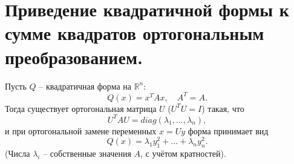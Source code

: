 \documentclass[14pt]{extreport}
\begin{document}
    \chapter{Приведение квадратичной формы к сумме квадратов ортогональным преобразованием.}

    \begin{thbox}
        Пусть $Q$ – квадратичная форма на $\mathbb{R}^n$:
        \[
        Q(x) = x^TAx, \quad A^T = A.
        \]
        Тогда существует ортогональная матрица $U$ ($U^TU=I$) такая, что
        \[
        U^TAU = diag(\lambda_1,...,\lambda_n),
        \]
        и при ортогональной замене переменных $x = Uy$ форма принимает вид
        \[
        Q(x) = \lambda_1y_1^2 + ... + \lambda_ny_n^2.
        \]
        (Числа $\lambda_i$ – собственные значения $A$, с учётом кратностей).
    \end{thbox}
\end{document}

